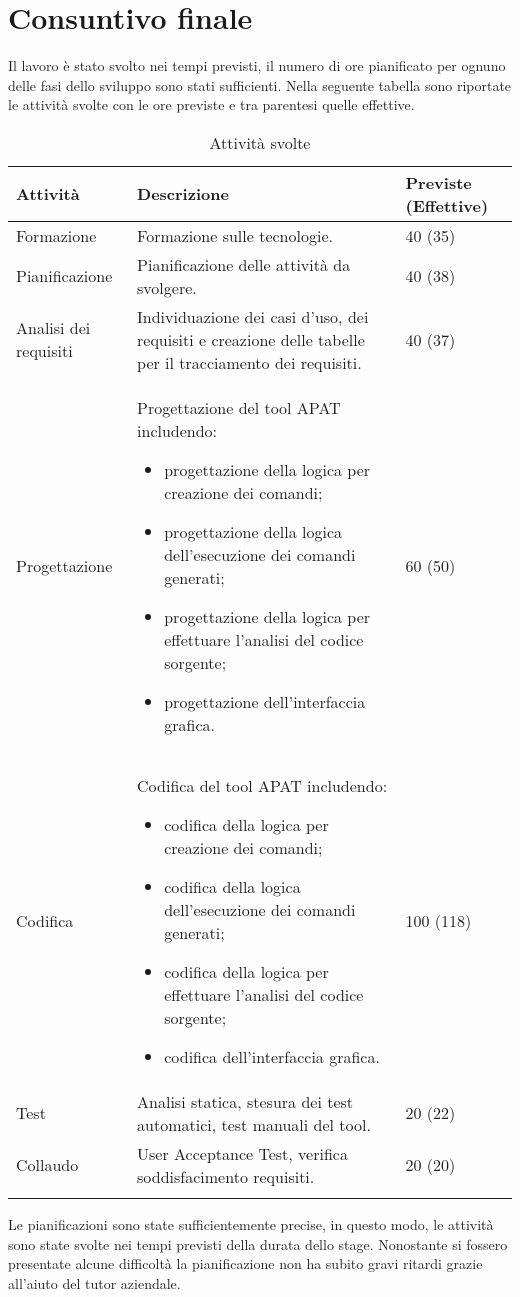 


\section{Consuntivo finale}\label{sec:consuntivo-finale}
Il lavoro è stato svolto nei tempi previsti, il numero di ore pianificato per ognuno delle fasi dello sviluppo sono stati sufficienti.
Nella seguente tabella sono riportate le attività svolte con le ore previste e tra parentesi quelle effettive.

\begin{longtable}{|C{3cm}|C{8cm}|C{2cm}|}
    \hline
    \textbf{Attività} &
    \textbf{Descrizione} &
    \textbf{Previste} (\textbf{Effettive}) \\\hline
    Formazione     & Formazione sulle tecnologie.
    & 40 (35) \\\hline
    Pianificazione & Pianificazione delle attività da svolgere.
    & 40 (38)    \\\hline
    Analisi dei requisiti & Individuazione dei casi d'uso, dei requisiti e creazione delle tabelle per il tracciamento dei requisiti.
    & 40 (37) \\\hline

    Progettazione & Progettazione del tool APAT includendo:
    \begin{itemize}%
        \item progettazione della logica per creazione dei comandi;
        \item progettazione della logica dell'esecuzione dei comandi generati;
        \item progettazione della logica per effettuare l'analisi del codice sorgente;
        \item progettazione dell'interfaccia grafica.
    \end{itemize}
    &60 (50)\\\hline
    Codifica & Codifica del tool APAT includendo:
    \begin{itemize}%
        \item codifica della logica per creazione dei comandi;
        \item codifica della logica dell'esecuzione dei comandi generati;
        \item codifica della logica per effettuare l'analisi del codice sorgente;
        \item codifica dell'interfaccia grafica.
    \end{itemize}
    & 100 (118) \\\hline
    Test           & Analisi statica, stesura dei test automatici, test manuali del tool.
    & 20 (22)   \\\hline
    Collaudo       & User Acceptance Test, verifica soddisfacimento requisiti.
    & 20 (20)    \\\hline
    \caption{Attività svolte}
\end{longtable}
Le pianificazioni sono state sufficientemente precise, in questo modo, le attività sono state svolte nei tempi previsti della durata dello stage.
Nonostante si fossero presentate alcune difficoltà la pianificazione non ha subito gravi ritardi grazie all'aiuto del tutor aziendale.